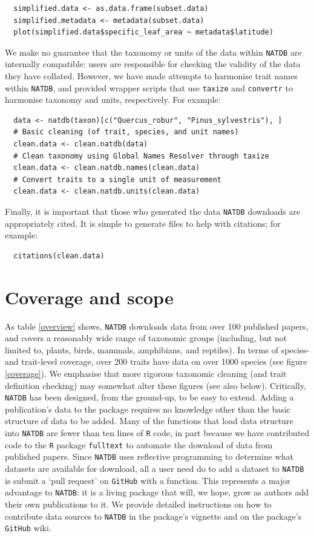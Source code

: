 \documentclass[12pt]{report}
\newcommand{\GitHub}{\texttt{GitHub}\xspace}
\newcommand{\R}{\texttt{R}\xspace}
\newcommand{\natdb}{\texttt{NATDB}\xspace}
\begin{document}
\begin{verbatim}
  simplified.data <- as.data.frame(subset.data)
  simplified.metadata <- metadata(subset.data)
  plot(simplified.data$specific_leaf_area ~ metadata$latitude)
\end{verbatim}

We make no guarantee that the taxonomy or units of the data within
\natdb are internally compatible: users are responsible for checking
the validity of the data they have collated. However, we have made
attempts to harmonise trait names within \natdb, and provided wrapper
scripts that use \texttt{taxize} and \texttt{convertr} to harmonise
taxonomy and units, respectively. For example:

\begin{verbatim}
  data <- natdb(taxon)[c("Quercus_robur", "Pinus_sylvestris"), ]
  # Basic cleaning (of trait, species, and unit names)
  clean.data <- clean.natdb(data)
  # Clean taxonomy using Global Names Resolver through taxize
  clean.data <- clean.natdb.names(clean.data)
  # Convert traits to a single unit of measurement
  clean.data <- clean.natdb.units(clean.data)
\end{verbatim}

Finally, it is important that those who generated the data \natdb
downloads are appropriately cited. It is simple to generate
 files to help with citations; for example:

\begin{verbatim}
  citations(clean.data)
\end{verbatim}

\clearpage
\section{Coverage and scope}
As table \ref{overview} shows, \natdb downloads data from over 100
published papers, and covers a reasonably wide range of taxonomic
groups (including, but not limited to, plants, birds, mammals,
amphibians, and reptiles). In terms of species- and trait-level
coverage, over 200 traits have data on over 1000 species (see figure
\ref{coverage}). We emphasise that more rigorous taxonomic cleaning
(and trait definition checking) may somewhat alter these figures (see
also below). Critically, \natdb has been designed, from the ground-up,
to be easy to extend. Adding a publication's data to the package
requires no knowledge other than the basic structure of data to be
added. Many of the functions that load data structure into \natdb are
fewer than ten lines of \R code, in part because we have contributed
code to the \R package \texttt{fulltext} \autocite{Chamberlain2015} to
automate the download of data from published papers. Since \natdb uses
reflective programming to determine what datasets are available for
download, all a user need do to add a dataset to \natdb is submit a
`pull request' on \GitHub with a function. This represents a major
advantage to \natdb: it is a living package that will, we hope, grow
as authors add their own publications to it. We provide detailed
instructions on how to contribute data sources to \natdb in the
package's vignette and on the package's \GitHub wiki.
\end{document}
